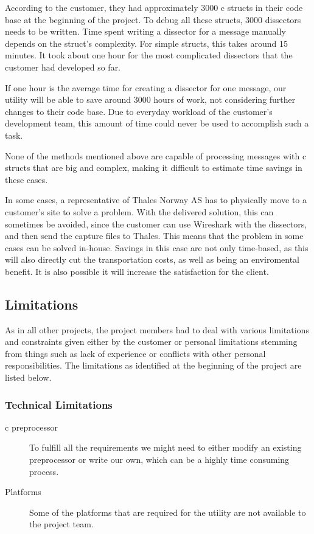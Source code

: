 According to the customer, they had approximately 3000 \Gls{c} \glspl{struct} in their code base at the beginning of the project.
To debug all these structs, 3000 \glspl{dissector} needs to be written. Time spent writing a \gls{dissector} for a message manually depends on the \gls{struct}’s complexity. For simple \glspl{struct}, this takes around 15 minutes. It took about one hour for the most complicated \glspl{dissector} that the customer had developed so far.

If one hour is the average time for creating a \gls{dissector} for one message, our utility will be able to save around 3000 hours of work, not considering further changes to their code base. Due to everyday workload of the customer’s development team, this amount of time could never be used to accomplish such a task.

None of the methods mentioned above are capable of processing messages with \Gls{c} \glspl{struct} that are big and complex, making it difficult to estimate time savings in these cases.

In some cases, a representative of Thales Norway AS has to physically move to a customer’s site to solve a problem.
With the delivered solution, this can sometimes be avoided, since the customer can use Wireshark with the dissectors, and then send the capture files to Thales. This means that the problem in some cases can be solved in-house. Savings in this case are not only time-based, as this will also directly cut the transportation costs, as well as being an enviromental benefit. It is also possible it will increase the satisfaction for the client.

\subsection{Limitations}
As in all other projects, the project members had to deal with various limitations and constraints given either by the customer or personal limitations stemming from things such as lack of experience or conflicts with other personal responsibilities. The limitations as identified at the beginning of the project are listed below. 

\subsubsection{Technical Limitations}
\begin{description}
	\item[\Gls{c} \gls{preprocessor}] To fulfill all the requirements we might need to
		either modify an existing \gls{preprocessor} or write our own, which can be
		a highly time consuming process.
	\item[Platforms] Some of the platforms that are required for the utility are not
		available to the project team.
\end{description}

